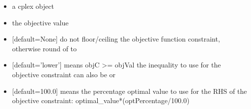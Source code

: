 \documentclass[letterpaper,10pt,english]{sphinxmanual}
\begin{document}
\begin{fulllineitems}
\label{\detokenize{modules_doc:cbmpy.CBCPLEX.cplx_func_SetObjectiveFunctionAsConstraint}}
\pysigstartsignatures
{}
\pysigstopsignatures\begin{description}
\begin{itemize}
\item {} 
\sphinxAtStartPar
{} a cplex object

\item {} 
\sphinxAtStartPar
{} the objective value

\item {} 
\sphinxAtStartPar
{}  {[}default=None{]} do not floor/ceiling the objective function constraint, otherwise round of to 

\item {} 
\sphinxAtStartPar
{} {[}default=’lower’{]} means objC \textgreater{}= objVal the inequality to use for the objective constraint can also be  or 

\item {} 
\sphinxAtStartPar
{} {[}default=100.0{]} means the percentage optimal value to use for the RHS of the objective constraint: optimal\_value*(optPercentage/100.0)

\end{itemize}

\end{description}

\end{fulllineitems}

\end{document}
